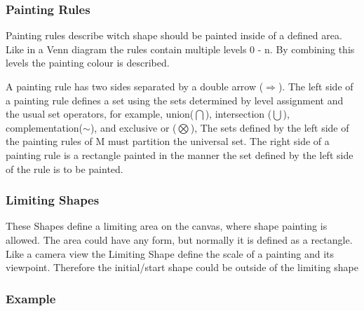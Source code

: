 \documentclass[11pt, a4paper]{report}
\begin{document}
\subsubsection{Painting Rules}
\label{sec:Shape_Grammar_Painting_Rules}
Painting rules describe witch shape should be painted inside of a defined area. Like in a Venn diagram the rules contain multiple levels 0 - n. By combining this levels the painting colour is described\citep{shapeGrammars:1972}.
\begin{displayquote}
    A painting rule has two sides separated by a double arrow ($\Rightarrow$). The left side of a painting rule defines a set using the sets determined by level assignment and the usual set operators, for example, union($\bigcap$), intersection ($\bigcup$), complementation($\sim$), and exclusive or ($\bigotimes$), The sets defined by the left side of the painting rules of M must partition the universal set. The right side of a painting rule is a rectangle painted in the manner the set defined by the left side of the rule is to be painted.
\end{displayquote}

\subsubsection{Limiting Shapes}
\label{sec:Shape_Grammar_Limiting_Shapes}
These Shapes define a limiting area on the canvas, where shape painting is allowed. 
The area could have any form, but normally it is defined as a rectangle. Like a camera view the Limiting Shape define the scale of a painting and its viewpoint. Therefore the initial/start shape could be outside of the limiting shape 

\subsubsection{Example\citep{shapeGrammars:1972}}
\end{document}
